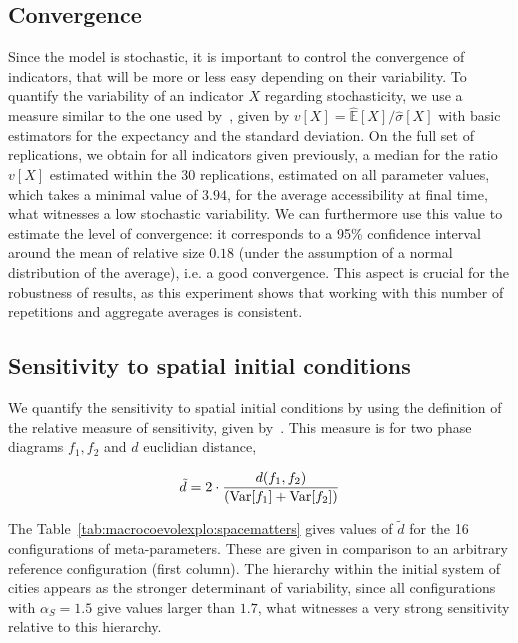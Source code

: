 \subsection{Convergence}

Since the model is stochastic, it is important to control the convergence of indicators, that will be more or less easy depending on their variability. To quantify the variability of an indicator $X$ regarding stochasticity, we use a measure similar to the one used by~\cite{raimbault2018calibration}, given by $v\left[X\right] = \hat{\mathbb{E}}\left[X\right]/\hat{\sigma}\left[X\right]$ with basic estimators for the expectancy and the standard deviation. On the full set of replications, we obtain for all indicators given previously, a median for the ratio $v\left[X\right]$ estimated within the 30 replications, estimated on all parameter values, which takes a minimal value of $3.94$, for the average accessibility at final time, what witnesses a low stochastic variability. We can furthermore use this value to estimate the level of convergence: it corresponds to a 95\% confidence interval around the mean of relative size $0.18$ (under the assumption of a normal distribution of the average), i.e. a good convergence. This aspect is crucial for the robustness of results, as this experiment shows that working with this number of repetitions and aggregate averages is consistent.


\subsection{Sensitivity to spatial initial conditions}

We quantify the sensitivity to spatial initial conditions by using the definition of the relative measure of sensitivity, given by~\cite{cottineau2017initial}. This measure is for two phase diagrams $f_1,f_2$ and $d$ euclidian distance, 

\begin{equation}
\tilde{d} = 2 \cdot \frac{d(f_1,f_2)}{(\operatorname{Var}\!\left[f_1\right]+\operatorname{Var}\!\left[f_2\right])}
\end{equation}

The Table~\ref{tab:macrocoevolexplo:spacematters} gives values of $\tilde{d}$ for the 16 configurations of meta-parameters. These are given in comparison to an arbitrary reference configuration (first column). The hierarchy within the initial system of cities appears as the stronger determinant of variability, since all configurations with $\alpha_S = 1.5$ give values larger than $1.7$, what witnesses a very strong sensitivity relative to this hierarchy.

